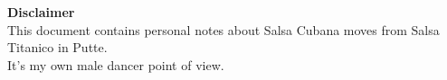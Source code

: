 \vspace*{\fill}

\begin{center}
\textbf{Disclaimer}\\
This document contains personal notes about Salsa Cubana moves from Salsa Titanico in Putte.\\
\noindent It's my own male dancer point of view.
\end{center}

\vspace*{\fill}
